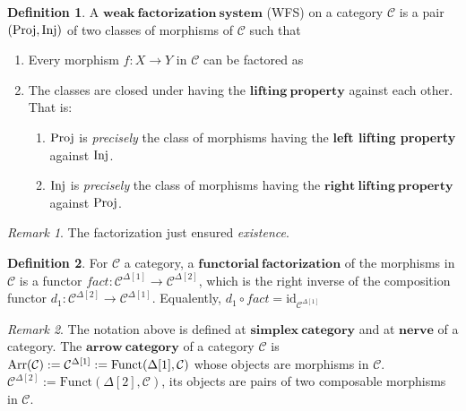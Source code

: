 \documentclass[a4paper]{article}
\theoremstyle{plain}
\theoremstyle{definition}
\newtheorem{defn}{Definition}[section]
\theoremstyle{remark}
\newtheorem*{rem}{Remark}
\newcommand{\mc}[1]{\mathcal{#1}}
\newcommand{\mbf}[1]{\mathbf{#1}}
\newcommand{\mcC}{\mc C}
\newcommand{\id}{\mathrm{id}}
\newcommand{\Fct}{\mathrm{Funct}}
\DeclareMathOperator{\Proj}{\rm{Proj}}
\DeclareMathOperator{\Inj}{\rm{Inj}}
\DeclareMathOperator{\Arr}{\rm{Arr}}
\begin{document}
    \begin{defn}
        A $\mbf{weak\ factorization\ system}$ (WFS) on a category $\mcC$ is
        a pair $(\Proj, \Inj)$ of two classes of morphisms of $\mcC$ such that

        \begin{enumerate}
            \item Every morphism $f : X \to Y$ in $\mcC$ can be factored as
            \item The classes are closed under having the $\mbf{lifting\ property}$ against each other.
            That is:
            \begin{enumerate}
                \item $\Proj$ is \emph{precisely} the class of morphisms having the \textbf{left lifting property} against $\Inj$.
                \item $\Inj$ is \emph{precisely} the class of morphisms having the $\mbf{right\ lifting\ property}$ against $\Proj$.
            \end{enumerate}
        \end{enumerate}

    \end{defn}

    \begin{rem}
        The factorization just ensured \emph{existence}.
    \end{rem}

    \begin{defn}
        For $\mcC$ a category, a $\mbf{functorial\ factorization}$ of the morphisms in $\mcC$ is a functor
        $ fact : \mcC^{\Delta[1]} \to \mcC^{\Delta[2]} $, which is the right inverse of
        the composition functor $d_1 : \mcC^{\Delta[2]} \to \mcC^{\Delta[1]} $. Equalently,
        $ d_1 \circ fact = \id_{\mcC^{\Delta[1]}} $
    \end{defn}
    
    \begin{rem}
        The notation above is defined at $\mbf{simplex\ category}$ and at $\mbf{nerve}$ of a category.
        The $\mbf{arrow\ category}$ of a category $\mcC$ is
        $\Arr(\mcC) := \mcC^{\Delta[1]} := \Fct(\Delta[1], \mcC)$ whose objects are morphisms in $\mcC$.
        $\mcC^{\Delta[2]} := \Fct(\Delta[2], \mcC)$, its objects are pairs of two composable morphisms in $\mcC$.
    \end{rem}
\end{document}
